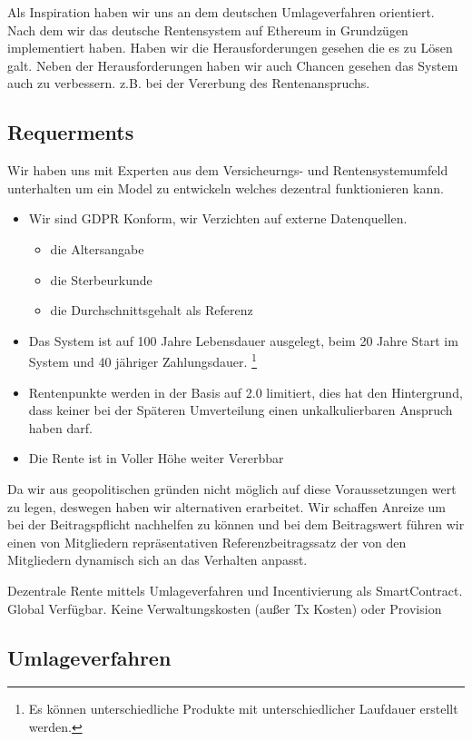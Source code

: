 Als Inspiration haben wir uns an dem deutschen Umlageverfahren orientiert. Nach dem wir das deutsche Rentensystem auf Ethereum in Grundzügen implementiert haben. Haben wir die Herausforderungen gesehen die es zu Lösen galt.
Neben der Herausforderungen haben wir auch Chancen gesehen das System auch zu verbessern. z.B. bei der Vererbung des Rentenanspruchs.


\subsection{Requerments}

Wir haben uns mit Experten aus dem Versicheurngs- und Rentensystemumfeld unterhalten um ein Model zu entwickeln welches dezentral funktionieren kann.

\begin{itemize}
\item Wir sind GDPR Konform, wir Verzichten auf externe Datenquellen.
 \begin{itemize}
 \item die Altersangabe 
 \item die Sterbeurkunde
 \item die Durchschnittsgehalt als Referenz
 \end{itemize}
\item Das System ist auf 100 Jahre Lebensdauer ausgelegt, beim 20 Jahre Start im System und 40 jähriger Zahlungsdauer. \footnote{ Es können unterschiedliche Produkte mit unterschiedlicher Laufdauer erstellt werden.}
\item Rentenpunkte werden in der Basis auf 2.0 limitiert, dies hat den Hintergrund, dass keiner bei der Späteren Umverteilung einen unkalkulierbaren Anspruch haben darf.
\item Die Rente ist in Voller Höhe weiter Vererbbar
\end{itemize}


Da wir aus geopolitischen gründen nicht möglich auf diese Voraussetzungen wert zu legen, deswegen haben wir alternativen erarbeitet.
Wir schaffen Anreize um bei der Beitragspflicht nachhelfen zu können und bei dem Beitragswert führen wir einen von Mitgliedern repräsentativen Referenzbeitragssatz der von den Mitgliedern dynamisch sich an das Verhalten anpasst.


Dezentrale Rente mittels Umlageverfahren und Incentivierung als SmartContract.
Global Verfügbar. Keine Verwaltungskosten (außer Tx Kosten) oder Provision

\subsection{Umlageverfahren}

